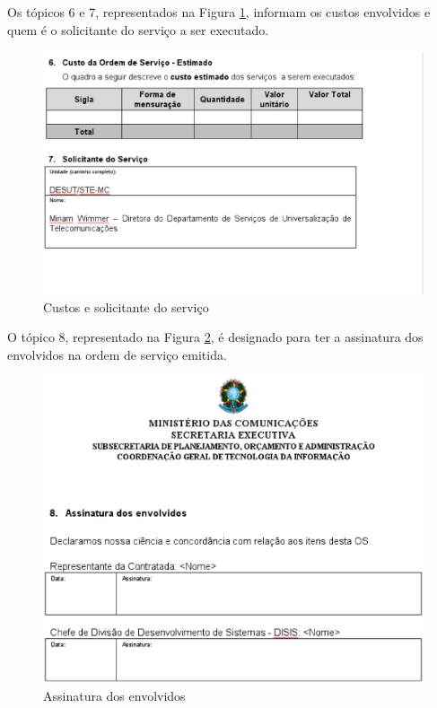 Os tópicos 6 e 7, representados na Figura \ref{fig:pt6_7}, informam os custos envolvidos
e quem é o solicitante do serviço a ser executado.

\begin{figure}[H]
  \centering
  \includegraphics[keepaspectratio=true,scale=0.5]{figures/pt6_7}
  \caption{Custos e solicitante do serviço \label{fig:pt6_7}}
\end{figure}

O tópico 8, representado na Figura \ref{fig:pt8}, é designado para ter a assinatura
dos envolvidos na ordem de serviço emitida.

\begin{figure}[H]
  \centering
  \includegraphics[keepaspectratio=true,scale=0.5]{figures/pt8}
  \caption{Assinatura dos envolvidos \label{fig:pt8}}
\end{figure}